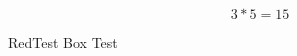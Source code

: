 \documentclass{liyua}
\begin{document}
$$3*5=15$$

\begin{customenvironment}{Red}{Test Box}
	Test
\end{customenvironment}
\end{document}
